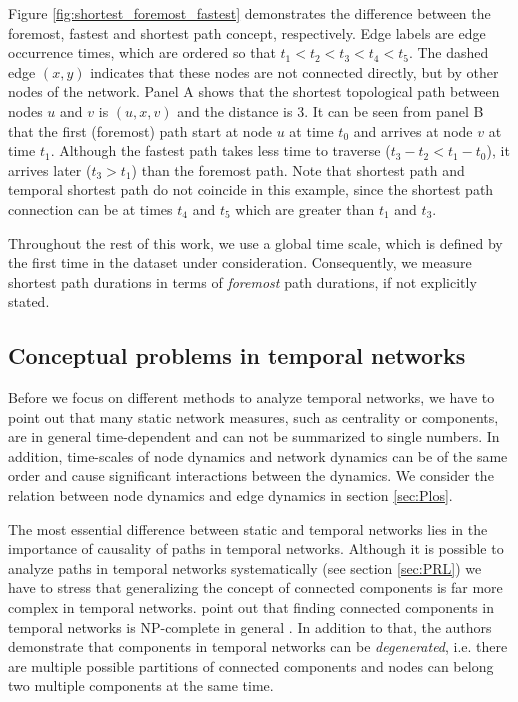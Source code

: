 Figure \ref{fig:shortest_foremost_fastest} demonstrates the difference between the foremost, fastest and shortest path concept, respectively.
Edge labels are edge occurrence times, which are ordered so that $t_1<t_2<t_3<t_4<t_5$.
The dashed edge $(x,y)$ indicates that these nodes are not connected directly, but by other nodes of the network.
Panel A shows that the shortest topological path between nodes $u$ and $v$ is $(u,x,v)$ and the distance is $3$.
It can be seen from panel B that the first (foremost) path start at node $u$ at time $t_0$ and arrives at node $v$ at time $t_1$.
Although the fastest path takes less time to traverse ($t_3-t_2<t_1-t_0$), it arrives later ($t_3>t_1$) than the foremost path.
Note that shortest path and temporal shortest path do not coincide in this example, since the shortest path connection can be at times $t_4$ and $t_5$ which are greater than $t_1$ and $t_3$.

Throughout the rest of this work, we use a global time scale, which is defined by the first time in the dataset under consideration.
Consequently, we measure shortest path durations in terms of \emph{foremost} path durations, if not explicitly stated.

\subsection{Conceptual problems in temporal networks}\label{sec:conceptual_problems}
Before we focus on different methods to analyze temporal networks, we have to point out that many static network measures, such as centrality or components, are in general time-dependent and can not be summarized to single numbers.
In addition, time-scales of node dynamics and network dynamics can be of the same order and cause significant interactions between the dynamics.
We consider the relation between node dynamics and edge dynamics in section \ref{sec:Plos}.

The most essential difference between static and temporal networks lies in the importance of causality of paths in temporal networks.
Although it is possible to analyze paths in temporal networks systematically (see section \ref{sec:PRL}) we have to stress that generalizing the concept of connected components is far more complex in temporal networks.
\citeauthor{Nicosia:2012hz} point out that finding connected components in temporal networks is NP-complete in general \citep{Nicosia:2012hz}.
In addition to that, the authors demonstrate that components in temporal networks can be \emph{degenerated}, i.e. there are multiple possible partitions of connected components and nodes can belong two multiple components at the same time.

